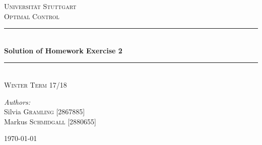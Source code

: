 \begin{center}


\textsc{\LARGE Universität Stuttgart}\\[1.5cm]

\textsc{\Large Optimal Control}\\[0.5cm]


\newcommand{\HRule}{\rule{\linewidth}{0.5mm}}
\HRule \\[0.4cm]
{ \huge \bfseries Solution of Homework Exercise 2}\\[0.4cm]

\HRule \\[1.5cm]

\textsc{\Large Winter Term 17/18}\\[2.5cm]

\begin{minipage}{0.4\textwidth}
\begin{center} \large
\emph{Authors:}\\
Silvia \textsc{Gramling} [2867885]\\
Markus \textsc{Schmidgall} [2880655]
\end{center}
\end{minipage}
\hfill

\vfill

{\large \today}

\end{center}